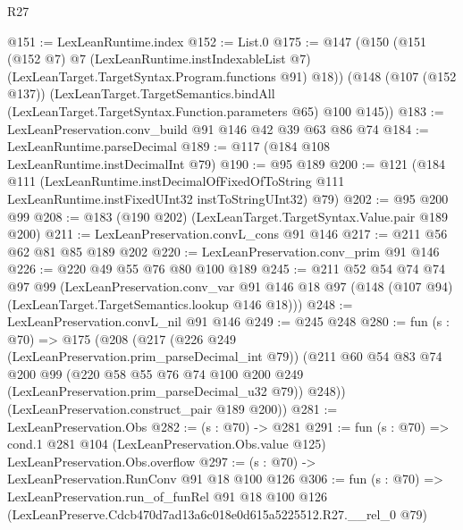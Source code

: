 \begin{lexlean}{R27}
\begin{coremodule}
@151 := LexLeanRuntime.index
@152 := List.{0}
@175 := @147
    (@150
      (@151
        (@152 @7)
        @7
        (LexLeanRuntime.instIndexableList @7)
        (LexLeanTarget.TargetSyntax.Program.functions @91)
        @18))
    (@148
      (@107 (@152 @137))
      (LexLeanTarget.TargetSemantics.bindAll
        (LexLeanTarget.TargetSyntax.Function.parameters @65)
        @100
        @145))
@183 := LexLeanPreservation.conv_build @91 @146 @42 @39 @63 @86 @74
@184 := LexLeanRuntime.parseDecimal
@189 := @117 (@184 @108 LexLeanRuntime.instDecimalInt @79)
@190 := @95 @189
@200 := @121
    (@184
      @111
      (LexLeanRuntime.instDecimalOfFixedOfToString
        @111
        LexLeanRuntime.instFixedUInt32
        instToStringUInt32)
      @79)
@202 := @95 @200 @99
@208 := @183 (@190 @202) (LexLeanTarget.TargetSyntax.Value.pair @189 @200)
@211 := LexLeanPreservation.convL_cons @91 @146
@217 := @211 @56 @62 @81 @85 @189 @202
@220 := LexLeanPreservation.conv_prim @91 @146
@226 := @220 @49 @55 @76 @80 @100 @189
@245 := @211
    @52
    @54
    @74
    @74
    @97
    @99
    (LexLeanPreservation.conv_var
      @91
      @146
      @18
      @97
      (@148 (@107 @94) (LexLeanTarget.TargetSemantics.lookup @146 @18)))
@248 := LexLeanPreservation.convL_nil @91 @146
@249 := @245 @248
@280 := fun (s : @70) =>
  @175
    (@208
      (@217
        (@226 @249 (LexLeanPreservation.prim_parseDecimal_int @79))
        (@211
          @60
          @54
          @83
          @74
          @200
          @99
          (@220 @58 @55 @76 @74 @100 @200 @249 (LexLeanPreservation.prim_parseDecimal_u32 @79))
          @248))
      (LexLeanPreservation.construct_pair @189 @200))
@281 := LexLeanPreservation.Obs
@282 := (s : @70) -> @281
@291 := fun (s : @70) =>
  cond.{1} @281 @104 (LexLeanPreservation.Obs.value @125) LexLeanPreservation.Obs.overflow
@297 := (s : @70) -> LexLeanPreservation.RunConv @91 @18 @100 @126
@306 := fun (s : @70) =>
  LexLeanPreservation.run_of_funRel
    @91
    @18
    @100
    @126
    (LexLeanPreserve.Cdcb470d7ad13a6c018e0d615a5225512.R27.__rel_0 @79)
\end{coremodule}
\end{lexlean}
